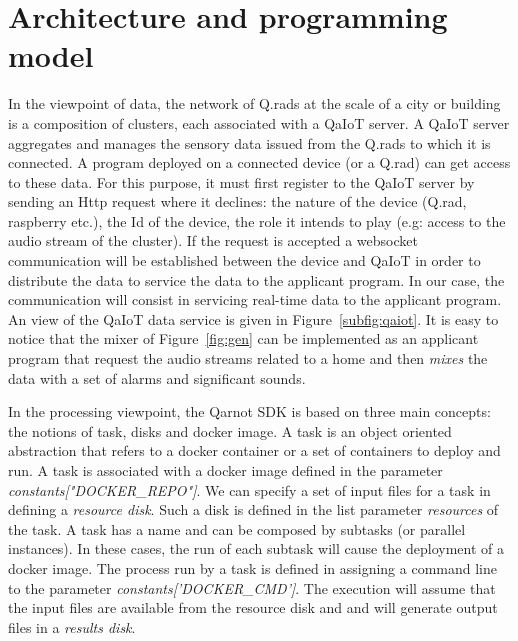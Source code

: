 \documentclass[10pt, conference, compsocconf]{IEEEtran}
\begin{document}
\section{Architecture and programming model} \label{Model}

In the viewpoint of data, the network of Q.rads at the scale of a city or building is a composition of clusters, each 
associated with a QaIoT server. A QaIoT server aggregates and manages the sensory data issued from the Q.rads to which it is 
connected. A program deployed on a connected device (or a Q.rad) can get access to these data. For this purpose, 
it must first register to the QaIoT server by sending an Http request where it declines: the nature of the device (Q.rad, 
raspberry etc.), the Id of the device, the role it intends to play (e.g: access to the audio stream of the cluster). If the 
request is accepted a websocket communication will be established between the device and QaIoT in order to distribute the data 
to service the data to the applicant program. In our case, the communication will consist in servicing real-time data 
to the applicant program. An view of the QaIoT data service is given in Figure~\ref{subfig:qaiot}. 
It is easy to notice that the mixer of Figure~\ref{fig:gen} can be implemented as an applicant program that request the audio streams  
related to a home and then {\it mixes} the data with a set of alarms and significant sounds.

In the processing viewpoint, the Qarnot SDK is based on three main concepts: the notions of task, 
disks and docker image. A task is an object oriented abstraction that refers to a 
docker container or a set of containers to deploy and run. A task is associated with a docker image defined in the 
parameter {\it constants["DOCKER\_REPO"]}. We can specify a set of input files for a task in defining a {\it resource disk}. 
Such a disk is defined in the list parameter {\it resources} of the task. 
A task has a name and can be composed by subtasks (or parallel instances).  
In these cases, the run of each subtask will cause the deployment of a docker image. The process run by a task is defined in 
assigning a command line to the parameter {\it constants['DOCKER\_CMD']}. The execution will assume that the input 
files are available from the resource disk and and will generate output files in a {\it results disk}.
\end{document}
